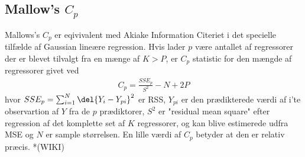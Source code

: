 \subsection{Mallow's $C_p$}
Mallows's $C_p$ er eqivivalent med Akiake Information Citeriet i det specielle tilfælde af Gaussian lineære regression. 
Hvis lader $p$ være antallet af regressorer der er blevet tilvalgt fra en mænge af $K > P$, er $C_p$ statistic for den mængde af regressorer givet ved 
\begin{align*}
C_p = \frac{SSE_p}{S^2} - N + 2P
\end{align*}
hvor $SSE_p = \sum_{i = 1}^N \del{Y_i - Y_{pi}}^2$ er RSS, $Y_{pi}$ er den prædikterede værdi af i'te observartion af $Y$ fra de $p$ prædiktorer, $S^2$ er "residual mean square" efter regression af det komplette set af $K$ regressorer, og kan blive estimerede udfra MSE og $N$ er sample størrelsen. 
En lille værdi af $C_p$ betyder at den er relativ præcis. 
*(WIKI)
 

